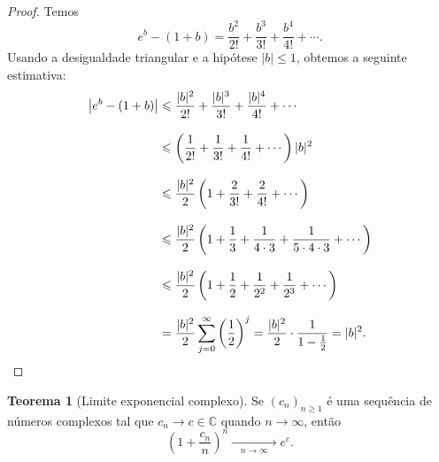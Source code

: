\documentclass[12pt,portuguese]{article}
\theoremstyle{definition}
\newtheorem{theorem}{Teorema}
\theoremstyle{plainexercise}
\theoremstyle{starredexercise}
\theoremstyle{definition}
\begin{document}
\begin{proof}
Temos
\[
e^{b}-(1+b)=\frac{b^{2}}{2!}+\frac{b^{3}}{3!}+\frac{b^{4}}{4!}+\cdots.
\]
Usando a desigualdade triangular e a hipótese $|b|\leqslant 1$, obtemos a
seguinte estimativa:
\begin{align*}
\bigl|e^{b}-(1+b)\bigr|
&\leqslant \frac{|b|^{2}}{2!}+\frac{|b|^{3}}{3!}+\frac{|b|^{4}}{4!}+\cdots \\[0.3cm]
&\leqslant \left(\frac{1}{2!}+\frac{1}{3!}+\frac{1}{4!}+\cdots\right)|b|^{2} \\[0.3cm]
&\leqslant \frac{|b|^{2}}{2}\left(1+\frac{2}{3!}+\frac{2}{4!}+\cdots\right) \\[0.3cm]
&\leqslant \frac{|b|^{2}}{2}\left(1+\frac{1}{3}+\frac{1}{4\cdot 3}+\frac{1}{5\cdot 4\cdot 3}+\cdots\right) \\[0.3cm]
&\leqslant \frac{|b|^{2}}{2}\left(1+\frac{1}{2}+\frac{1}{2^{2}}+\frac{1}{2^{3}}+\cdots\right) \\[0.3cm]
&= \frac{|b|^{2}}{2}\sum_{j=0}^{\infty}\left(\frac{1}{2}\right)^{j}
= \frac{|b|^{2}}{2}\cdot\frac{1}{1-\frac{1}{2}}
= |b|^{2}. \qedhere
\end{align*}
\end{proof}

\begin{theorem}[Limite exponencial complexo]\label{thm:man-limite-exp}
Se $(c_n)_{n\geqslant1}$ é uma sequência de números complexos tal que
$c_n\to c\in\mathbb{C}$ quando $n\to\infty$, então
\[
\left(1+\frac{c_n}{n}\right)^{n}
\xrightarrow[\quad n\to\infty\quad ]{}
e^{c}.
\]
\end{theorem}
\end{document}
